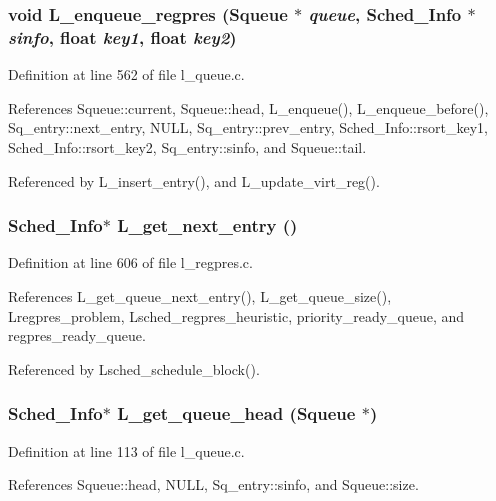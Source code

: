 \subsubsection{\setlength{\rightskip}{0pt plus 5cm}void L\_\-enqueue\_\-regpres (\bf{Squeue} $\ast$ {\em queue}, \bf{Sched\_\-Info} $\ast$ {\em sinfo}, float {\em key1}, float {\em key2})}\label{l__schedule_8h_8227bd45b0f57f5d6f07e6af4a46b1d6}




Definition at line 562 of file l\_\-queue.c.

References Squeue::current, Squeue::head, L\_\-enqueue(), L\_\-enqueue\_\-before(), Sq\_\-entry::next\_\-entry, NULL, Sq\_\-entry::prev\_\-entry, Sched\_\-Info::rsort\_\-key1, Sched\_\-Info::rsort\_\-key2, Sq\_\-entry::sinfo, and Squeue::tail.

Referenced by L\_\-insert\_\-entry(), and L\_\-update\_\-virt\_\-reg().
\subsubsection{\setlength{\rightskip}{0pt plus 5cm}\bf{Sched\_\-Info}$\ast$ L\_\-get\_\-next\_\-entry ()}\label{l__schedule_8h_0c02c6c4c315bd64ecf3c512ee700d87}




Definition at line 606 of file l\_\-regpres.c.

References L\_\-get\_\-queue\_\-next\_\-entry(), L\_\-get\_\-queue\_\-size(), Lregpres\_\-problem, Lsched\_\-regpres\_\-heuristic, priority\_\-ready\_\-queue, and regpres\_\-ready\_\-queue.

Referenced by Lsched\_\-schedule\_\-block().
\subsubsection{\setlength{\rightskip}{0pt plus 5cm}\bf{Sched\_\-Info}$\ast$ L\_\-get\_\-queue\_\-head (\bf{Squeue} $\ast$)}\label{l__schedule_8h_c5f40457eb3bbc0213d09e6802d910e9}




Definition at line 113 of file l\_\-queue.c.

References Squeue::head, NULL, Sq\_\-entry::sinfo, and Squeue::size.

